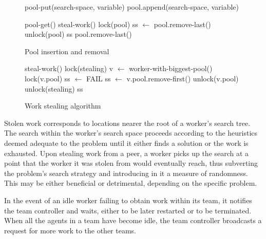 \documentclass{llncs}
\begin{document}
\begin{figure}[h!t]
  \centering
  {
    \sffamily
    \begin{algorithmic}[1]
      \PROC pool-put(search-space, variable)
        \State pool.append(search-space, variable)         \label{pool:put}
      \CORP

      \Statex

      \PROC pool-get()
          \State \Return steal-work()
                            \label{pool:safe}
          \State lock(pool)
          \State ss $\leftarrow$ pool.remove-last()        \label{pool:rlast1}
          \State unlock(pool)
          \State \Return ss
        \Else
          \State \Return pool.remove-last()                \label{pool:rlast2}
        \EndIf
      \CORP
    \end{algorithmic}
  }
  \caption{Pool insertion and removal}
  \label{algo:pool-put-get}
\end{figure}

\begin{figure}[h!t]
  \centering
  {
    \sffamily
    \begin{algorithmic}[1]
      \PROC steal-work()
        \State lock(stealing)
        \State v $\leftarrow$ worker-with-biggest-pool()
        \State lock(v.pool)
                             \label{pool:thresh}
          \State ss $\leftarrow$ FAIL
        \Else
          \State ss $\leftarrow$ v.pool.remove-first()     \label{pool:rfirst}
        \EndIf
        \State unlock(v.pool)
        \State unlock(stealing)
        \State \Return ss
      \CORP
    \end{algorithmic}
  }
  \caption{Work stealing algorithm}
  \label{algo:steal}
\end{figure}

Stolen work corresponds to locations nearer the root of a worker's
search tree. The search within the worker's search space proceeds
according to the heuristics deemed adequate to the problem until it
either finds a solution or the work is exhausted. Upon stealing work
from a peer, a worker picks up the search at a point that the worker
it was stolen from would eventually reach, thus subverting the
problem's search strategy and introducing in it a measure of
randomness. This may be either beneficial or detrimental, depending on
the specific problem.

In the event of an idle worker failing to obtain work within its team,
it notifies the team controller and waits, either to be later restarted or
to be terminated. When all the agents in a team have become idle, the
team controller broadcasts a request for more work to the other teams.
\end{document}

